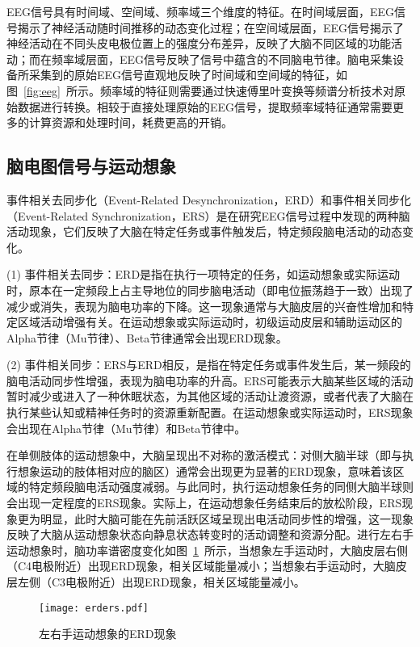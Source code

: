 EEG信号具有时间域、空间域、频率域三个维度的特征。在时间域层面，EEG信号揭示了神经活动随时间推移的动态变化过程；在空间域层面，EEG信号揭示了神经活动在不同头皮电极位置上的强度分布差异，反映了大脑不同区域的功能活动；而在频率域层面，EEG信号反映了信号中蕴含的不同脑电节律。脑电采集设备所采集到的原始EEG信号直观地反映了时间域和空间域的特征，如图~\ref{fig:eeg}~所示。频率域的特征则需要通过快速傅里叶变换等频谱分析技术对原始数据进行转换。相较于直接处理原始的EEG信号，提取频率域特征通常需要更多的计算资源和处理时间，耗费更高的开销。

\subsection{脑电图信号与运动想象}

事件相关去同步化（Event-Related Desynchronization，ERD）和事件相关同步化（Event-Related Synchronization，ERS）是在研究EEG信号过程中发现的两种脑活动现象，它们反映了大脑在特定任务或事件触发后，特定频段脑电活动的动态变化。

(1) 事件相关去同步：ERD是指在执行一项特定的任务，如运动想象或实际运动时，原本在一定频段上占主导地位的同步脑电活动（即电位振荡趋于一致）出现了减少或消失，表现为脑电功率的下降。这一现象通常与大脑皮层的兴奋性增加和特定区域活动增强有关。在运动想象或实际运动时，初级运动皮层和辅助运动区的Alpha节律（Mu节律）、Beta节律通常会出现ERD现象。

(2) 事件相关同步：ERS与ERD相反，是指在特定任务或事件发生后，某一频段的脑电活动同步性增强，表现为脑电功率的升高。ERS可能表示大脑某些区域的活动暂时减少或进入了一种休眠状态，为其他区域的活动让渡资源，或者代表了大脑在执行某些认知或精神任务时的资源重新配置。在运动想象或实际运动时，ERS现象会出现在Alpha节律（Mu节律）和Beta节律中。

在单侧肢体的运动想象中，大脑呈现出不对称的激活模式：对侧大脑半球（即与执行想象运动的肢体相对应的脑区）通常会出现更为显著的ERD现象，意味着该区域的特定频段脑电活动强度减弱\cite{pfurtscheller1977event}。与此同时，执行运动想象任务的同侧大脑半球则会出现一定程度的ERS现象。实际上，在运动想象任务结束后的放松阶段，ERS现象更为明显，此时大脑可能在先前活跃区域呈现出电活动同步性的增强，这一现象反映了大脑从运动想象状态向静息状态转变时的活动调整和资源分配。进行左右手运动想象时，脑功率谱密度变化如图~\ref{fig:erders}~所示，当想象左手运动时，大脑皮层右侧（C4电极附近）出现ERD现象，相关区域能量减小；当想象右手运动时，大脑皮层左侧（C3电极附近）出现ERD现象，相关区域能量减小\cite{blankertz2010neurophysiological}。
\begin{figure}[ht]
    \centering
    \texttt{[image: erders.pdf]}
    \caption{左右手运动想象的ERD现象\cite{blankertz2010neurophysiological}}
    \label{fig:erders}
\end{figure}

